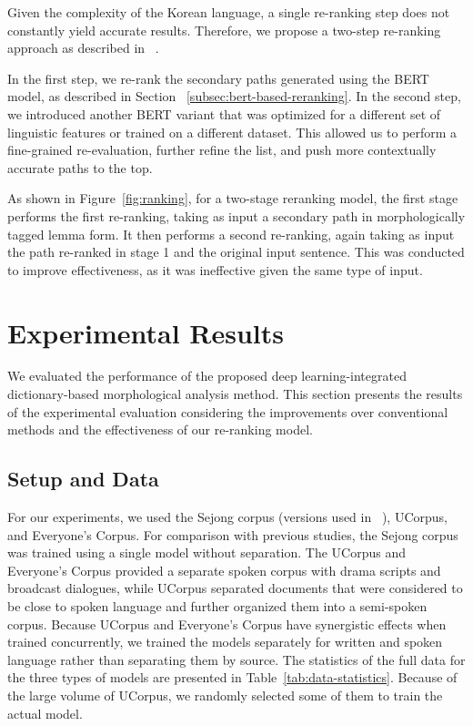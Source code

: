 \documentclass[AMS,STIX2COL]{WileyNJD-v2}
\begin{document}
    Given the complexity of the Korean language, a single re-ranking step does not constantly yield accurate results.
    Therefore, we propose a two-step re-ranking approach as described in ~\cite{Nogueira2019}.

    In the first step, we re-rank the secondary paths generated using the BERT model, as described in Section ~\ref{subsec:bert-based-reranking}.
    In the second step, we introduced another BERT variant that was optimized for a different set of linguistic features or trained on a different dataset.
    This allowed us to perform a fine-grained re-evaluation, further refine the list, and push more contextually accurate paths to the top.

    As shown in Figure~\ref{fig:ranking}, for a two-stage reranking model, the first stage performs the first re-ranking, taking as input a secondary path in morphologically tagged lemma form.
    It then performs a second re-ranking, again taking as input the path re-ranked in stage 1 and the original input sentence.
    This was conducted to improve effectiveness, as it was ineffective given the same type of input.


    \section{Experimental Results}\label{sec:results}

    We evaluated the performance of the proposed deep learning-integrated dictionary-based morphological analysis method.
    This section presents the results of the experimental evaluation considering the improvements over conventional methods and the effectiveness of our re-ranking model.

    \subsection{Setup and Data}\label{subsec:setup-and-data}

    For our experiments, we used the Sejong corpus (versions used in ~\cite{NaSH2014, NaSH2015, NaSH2018, SongHJ2019, SongHJ2020}), UCorpus\cite{UCorpusHG}, and Everyone's Corpus\cite{EveryoneCorpus}.
    For comparison with previous studies, the Sejong corpus was trained using a single model without separation.
    The UCorpus and Everyone's Corpus provided a separate spoken corpus with drama scripts and broadcast dialogues, while UCorpus separated documents that were considered to be close to spoken language and further organized them into a semi-spoken corpus.
    Because UCorpus and Everyone's Corpus have synergistic effects when trained concurrently, we trained the models separately for written and spoken language rather than separating them by source.
    The statistics of the full data for the three types of models are presented in Table~\ref{tab:data-statistics}.
    Because of the large volume of UCorpus, we randomly selected some of them to train the actual model.
\end{document}
